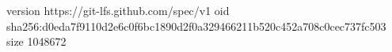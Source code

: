 version https://git-lfs.github.com/spec/v1
oid sha256:d0eda7f9110d2e6c0f6bc1890d2f0a329466211b520c452a708c0cec737fc503
size 1048672
